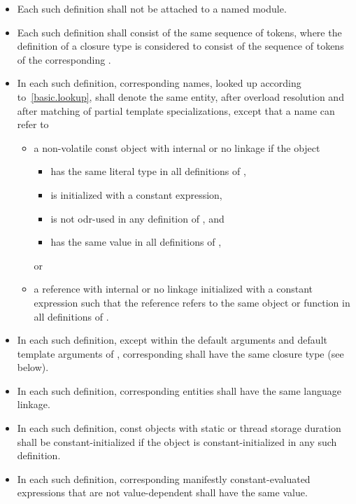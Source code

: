 \begin{itemize}
\item Each such definition
shall not be attached to a named module.
\item Each such definition shall consist of
the same sequence of tokens,
where the definition of a closure type
is considered to consist of the sequence of tokens of
the corresponding .
\item In each such definition, corresponding names, looked up
according to~\ref{basic.lookup}, shall denote the same entity, after
overload resolution and after matching of partial
template specializations, except that a name can refer to
\begin{itemize}
\item
a non-volatile const object with internal or no linkage if the object
\begin{itemize}
\item has the same literal type in all definitions of ,
\item is initialized with a constant expression,
\item is not odr-used in any definition of , and
\item has the same value in all definitions of ,
\end{itemize}
or
\item
a reference with internal or no linkage
initialized with a constant expression such that
the reference refers to the same object or function in all definitions of .
\end{itemize}

\item In each such definition, except within
the default arguments and default template arguments of ,
corresponding  shall have
the same closure type (see below).

\item In each such definition, corresponding entities shall have the
same language linkage.

\item In each such definition,
const objects with static or thread storage duration
shall be constant-initialized if
the object is constant-initialized in any such definition.

\item In each such definition,
corresponding manifestly constant-evaluated expressions
that are not value-dependent
shall have the same value.


\end{itemize}
